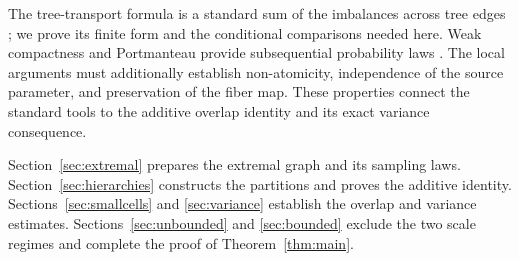 The tree-transport formula is a standard sum of the imbalances across
tree edges \cite[Section~2, Equation~(5)]{TreeTransport}; we prove its
finite form and the conditional comparisons needed here. Weak
compactness and Portmanteau provide subsequential probability laws
\cite[Proposition~5.3 and Theorems~4.2,~3.2]{WeakCompactness}.
The local arguments must additionally establish non-atomicity,
independence of the source parameter, and preservation of the fiber
map. These properties connect the standard tools to the additive
overlap identity and its exact variance consequence.

Section~\ref{sec:extremal} prepares the extremal graph and its sampling
laws. Section~\ref{sec:hierarchies} constructs the partitions and proves
the additive identity. Sections~\ref{sec:smallcells} and
\ref{sec:variance} establish the overlap and variance estimates.
Sections~\ref{sec:unbounded} and \ref{sec:bounded} exclude the two scale
regimes and complete the proof of Theorem~\ref{thm:main}.
